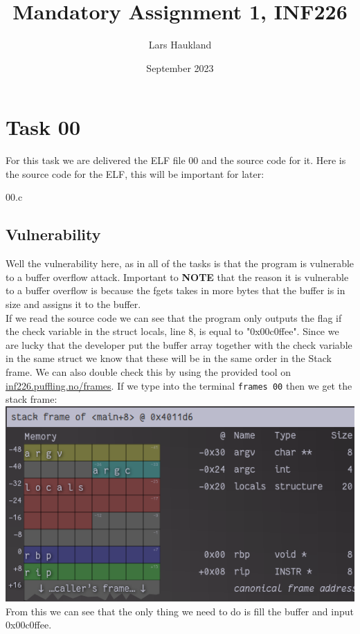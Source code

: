 \documentclass{article}
\title{Mandatory Assignment 1, INF226}
\author{Lars Haukland}
\date{September 2023}
\begin{document}
\maketitle

\section{Task 00}

For this task we are delivered the ELF file 00 and the source code for it.
Here is the source code for the ELF, this will be important for later:

{00.c}

\subsection{Vulnerability}
Well the vulnerability here, as in all of the tasks is that the program is vulnerable to a buffer overflow attack. Important to \textbf{NOTE} that the reason it is vulnerable to a buffer overflow is because the fgets takes in more bytes that the buffer is in size and assigns it to the buffer.\\
If we read the source code we can see that the program only outputs the flag if the check variable in the struct locals, line 8, is equal to "0x00c0ffee".
Since we are lucky that the developer put the buffer array together with the check variable in the same struct we know that these will be in the same order in the Stack frame. We can also double check this by using the provided tool on \url{inf226.puffling.no/frames}. If we type into the terminal \lstinline{frames 00} then we get the stack frame:\\
\includegraphics[scale=0.5]{stackframe-00.png} \\
From this we can see that the only thing we need to do is fill the buffer and input 0x00c0ffee.
\end{document}
